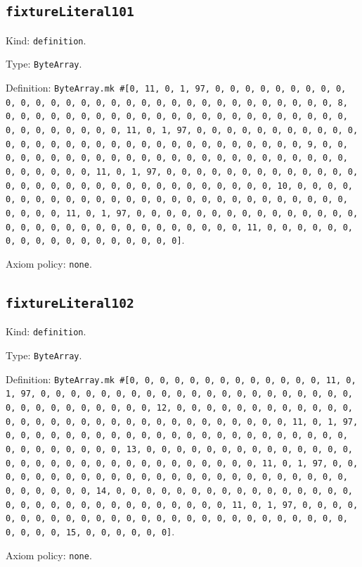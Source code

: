 \documentclass[11pt]{article}
\begin{document}
\subsection*{\texttt{fixtureLiteral101}}
\noindent Kind: \texttt{definition}.\par
\noindent Type: \texttt{ByteArray}.\par
\noindent Definition: \texttt{ByteArray.mk \#[0, 11, 0, 1, 97, 0, 0, 0, 0, 0, 0, 0, 0, 0, 0, 0, 0, 0, 0, 0, 0, 0, 0, 0, 0, 0, 0, 0, 0, 0, 0, 0, 0, 0, 0, 0, 8, 0, 0, 0, 0, 0, 0, 0, 0, 0, 0, 0, 0, 0, 0, 0, 0, 0, 0, 0, 0, 0, 0, 0, 0, 0, 0, 0, 0, 0, 0, 0, 11, 0, 1, 97, 0, 0, 0, 0, 0, 0, 0, 0, 0, 0, 0, 0, 0, 0, 0, 0, 0, 0, 0, 0, 0, 0, 0, 0, 0, 0, 0, 0, 0, 0, 0, 9, 0, 0, 0, 0, 0, 0, 0, 0, 0, 0, 0, 0, 0, 0, 0, 0, 0, 0, 0, 0, 0, 0, 0, 0, 0, 0, 0, 0, 0, 0, 0, 11, 0, 1, 97, 0, 0, 0, 0, 0, 0, 0, 0, 0, 0, 0, 0, 0, 0, 0, 0, 0, 0, 0, 0, 0, 0, 0, 0, 0, 0, 0, 0, 0, 0, 0, 10, 0, 0, 0, 0, 0, 0, 0, 0, 0, 0, 0, 0, 0, 0, 0, 0, 0, 0, 0, 0, 0, 0, 0, 0, 0, 0, 0, 0, 0, 0, 0, 11, 0, 1, 97, 0, 0, 0, 0, 0, 0, 0, 0, 0, 0, 0, 0, 0, 0, 0, 0, 0, 0, 0, 0, 0, 0, 0, 0, 0, 0, 0, 0, 0, 0, 0, 11, 0, 0, 0, 0, 0, 0, 0, 0, 0, 0, 0, 0, 0, 0, 0, 0, 0, 0]}.\par
\noindent Axiom policy: \texttt{none}.\par
\subsection*{\texttt{fixtureLiteral102}}
\noindent Kind: \texttt{definition}.\par
\noindent Type: \texttt{ByteArray}.\par
\noindent Definition: \texttt{ByteArray.mk \#[0, 0, 0, 0, 0, 0, 0, 0, 0, 0, 0, 0, 0, 11, 0, 1, 97, 0, 0, 0, 0, 0, 0, 0, 0, 0, 0, 0, 0, 0, 0, 0, 0, 0, 0, 0, 0, 0, 0, 0, 0, 0, 0, 0, 0, 0, 0, 0, 12, 0, 0, 0, 0, 0, 0, 0, 0, 0, 0, 0, 0, 0, 0, 0, 0, 0, 0, 0, 0, 0, 0, 0, 0, 0, 0, 0, 0, 0, 0, 0, 11, 0, 1, 97, 0, 0, 0, 0, 0, 0, 0, 0, 0, 0, 0, 0, 0, 0, 0, 0, 0, 0, 0, 0, 0, 0, 0, 0, 0, 0, 0, 0, 0, 0, 0, 13, 0, 0, 0, 0, 0, 0, 0, 0, 0, 0, 0, 0, 0, 0, 0, 0, 0, 0, 0, 0, 0, 0, 0, 0, 0, 0, 0, 0, 0, 0, 0, 11, 0, 1, 97, 0, 0, 0, 0, 0, 0, 0, 0, 0, 0, 0, 0, 0, 0, 0, 0, 0, 0, 0, 0, 0, 0, 0, 0, 0, 0, 0, 0, 0, 0, 0, 14, 0, 0, 0, 0, 0, 0, 0, 0, 0, 0, 0, 0, 0, 0, 0, 0, 0, 0, 0, 0, 0, 0, 0, 0, 0, 0, 0, 0, 0, 0, 0, 11, 0, 1, 97, 0, 0, 0, 0, 0, 0, 0, 0, 0, 0, 0, 0, 0, 0, 0, 0, 0, 0, 0, 0, 0, 0, 0, 0, 0, 0, 0, 0, 0, 0, 0, 15, 0, 0, 0, 0, 0, 0]}.\par
\noindent Axiom policy: \texttt{none}.\par
\end{document}
